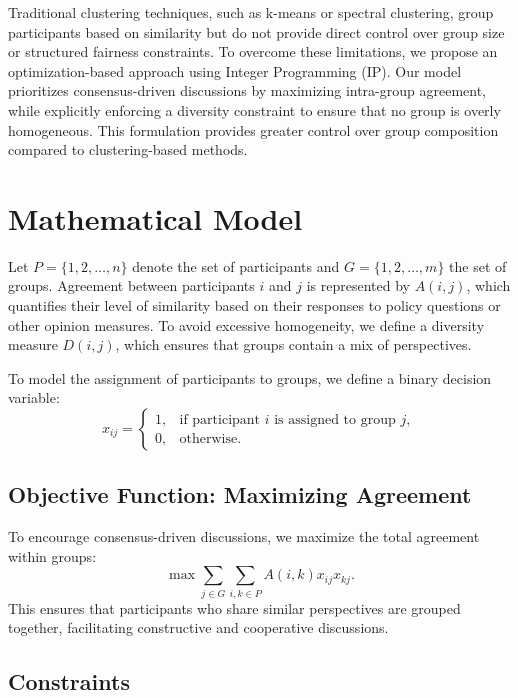 \documentclass[11pt,a4paper]{article}
\begin{document}
Traditional clustering techniques, such as k-means or spectral clustering, group participants based on similarity but do not provide direct control over group size or structured fairness constraints. To overcome these limitations, we propose an optimization-based approach using Integer Programming (IP). Our model prioritizes consensus-driven discussions by maximizing intra-group agreement, while explicitly enforcing a diversity constraint to ensure that no group is overly homogeneous. This formulation provides greater control over group composition compared to clustering-based methods.

\section{Mathematical Model}
\label{sec-model}

Let \( P = \{1, 2, \dots, n\} \) denote the set of participants and \( G = \{1, 2, \dots, m\} \) the set of groups. Agreement between participants \( i \) and \( j \) is represented by \( A(i, j) \), which quantifies their level of similarity based on their responses to policy questions or other opinion measures. To avoid excessive homogeneity, we define a diversity measure \( D(i, j) \), which ensures that groups contain a mix of perspectives.

To model the assignment of participants to groups, we define a binary decision variable:
\begin{equation}
    x_{ij} =
    \begin{cases} 
        1, & \text{if participant } i \text{ is assigned to group } j, \\
        0, & \text{otherwise}.
    \end{cases}
\end{equation}

\subsection{Objective Function: Maximizing Agreement}

To encourage consensus-driven discussions, we maximize the total agreement within groups:
\begin{equation}
\max \sum_{j \in G} \sum_{i,k \in P} A(i,k) x_{ij} x_{kj}.
\end{equation}
This ensures that participants who share similar perspectives are grouped together, facilitating constructive and cooperative discussions.

\subsection{Constraints}
\end{document}
